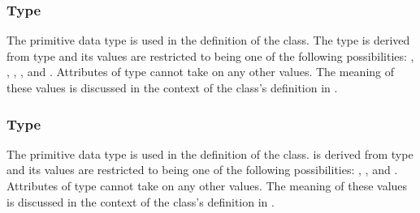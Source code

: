 \subsubsection{Type \fixttspace{}}
\label{primtype-boundaryconditionkind}

The  primitive data type is used in the definition of the \BoundaryCondition class.  The type  is derived from type  and its values are restricted to being one of the following possibilities: , , , , and .  Attributes of type  cannot take on any other values.  The meaning of these values is discussed in the context of the \BoundaryCondition class's definition in .


\subsubsection{Type \fixttspace{}}
\label{primtype-componentkind}

The  primitive data type is used in the definition of the \CoordinateComponent class.   is derived from type  and its values are restricted to being one of the following possibilities: , , and .
Attributes of type  cannot take on any other values.  The meaning of these values is discussed in the context of the \CoordinateComponent class's definition in .




%



